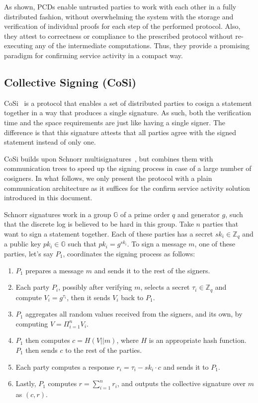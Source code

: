 As shown, PCDs enable untrusted parties to work with each other in a fully distributed 
fashion, without overwhelming the system with the storage and verification of individual 
proofs for each step of the performed protocol. Also, they attest to correctness or compliance  
to the prescribed protocol without re-executing any of the intermediate computations. Thus, 
they provide a promising paradigm for confirming service activity in a compact way.


\subsection{Collective Signing (CoSi)}
\label{cosi}
CoSi~\cite{syta2016keeping} is a protocol that enables a set of distributed parties to cosign a 
statement together in a way that produces a single signature. As such, both the 
verification time and the space requirements are just like having a single signer. The 
difference is that this signature attests that all parties agree with the signed 
statement instead of only one.


CoSi builds upon Schnorr 
multisignatures~\cite{schnorr1991efficient, bellare2006multi, micali2001accountable}, but combines 
them with communication trees to speed up the signing process in 
case of a large number of cosigners. In what follows, we only present the protocol
with a plain communication architecture as it suffices for the confirm service activity 
solution introduced in this document.


Schnorr signatures work in a group $\mathbb{G}$ of a prime order $q$ and 
generator $g$, such that the discrete log is believed to be hard in this group. 
Take $n$ parties that want to sign a statement together. 
Each of these parties has a secret $sk_i \in \mathbb{Z}_q$ and a public key 
$pk_i \in \mathbb{G}$ such that $pk_i = g^{sk_i}$. To sign a message $m$, 
one of these parties, let's say $P_1$, coordinates the signing process as follows: 
\begin{enumerate}
\setlength{\itemsep}{0pt}
\item $P_1$ prepares a message $m$ and sends it to the rest of the signers.

\item Each party $P_i$, possibly after verifying 
$m$, selects a secret $\tau_i \in \mathbb{Z}_q$ and compute $V_i = g^{\tau_i}$, 
then it sends $V_i$ back to $P_1$.

\item $P_1$ aggregates all random values received from 
the signers, and its own, by computing $V = \Pi_{i =1}^n V_i$.

\item $P_1$ then computes 
$c = H(V||m)$, where $H$ is an appropriate hash function. $P_1$ then 
sends $c$ to the rest of the parties.

\item Each party computes a response $r_i = \tau_i - sk_i\cdot c$ and 
sends it to $P_1$.

\item Lastly, $P_1$ computes $r = \sum_{i=1}^n r_i$, and outputs the 
collective signature over $m$ as $(c, r)$.
\end{enumerate}


